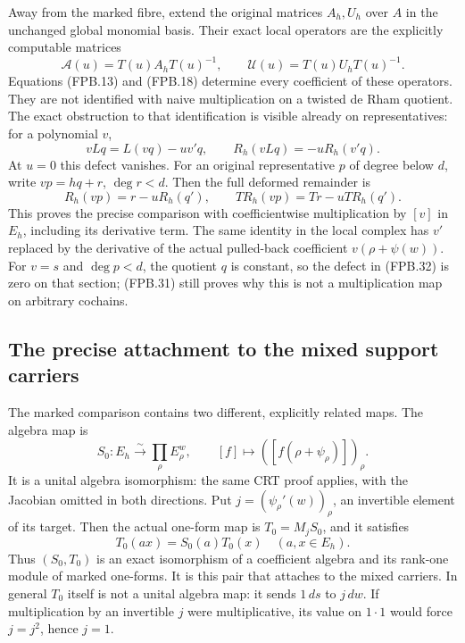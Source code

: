Away from the marked fibre, extend the original matrices \(A_h,U_h\)
over \(A\) in the unchanged global monomial basis. Their exact local
operators are the explicitly computable matrices
\[
 \mathcal A(u)=T(u)A_hT(u)^{-1},\qquad
 \mathcal U(u)=T(u)U_hT(u)^{-1}.
 \tag{FPB.30}\label{eq:fpb-transported-operators}
\]
Equations (FPB.13) and (FPB.18) determine every coefficient of these
operators. They are not identified with naive multiplication on a
twisted de Rham quotient. The exact obstruction to that identification
is visible already on representatives: for a polynomial \(v\),
\[
 vLq=L(vq)-u v'q,\qquad
 R_h(vLq)=-uR_h(v'q).
 \tag{FPB.31}\label{eq:fpb-Leibniz}
\]
At \(u=0\) this defect vanishes. For an original representative
\(p\) of degree below \(d\), write \(vp=hq+r\), \(\deg r<d\).
Then the full deformed remainder is
\[
 R_h(vp)=r-uR_h(q'),
 \qquad
 T R_h(vp)=T r-uT R_h(q').
 \tag{FPB.32}\label{eq:fpb-mult-remainder}
\]
This proves the precise comparison with coefficientwise multiplication
by \([v]\) in \(E_h\), including its derivative term. The same
identity in the local complex has \(v'\) replaced by the derivative
of the actual pulled-back coefficient \(v(\rho+\psi(w))\).
For \(v=s\) and \(\deg p<d\), the quotient \(q\) is constant,
so the defect in (FPB.32) is zero on that section; (FPB.31) still
proves why this is not a multiplication map on arbitrary cochains.

\subsection{The precise attachment to the mixed support carriers}

The marked comparison contains two different, explicitly related
maps. The algebra map is
\[
 S_0:E_h\xrightarrow{\sim}\prod_\rho E_\rho^w,
 \qquad [f]\longmapsto([f(\rho+\psi_\rho)])_\rho.
 \tag{FPB.33}\label{eq:fpb-ring-map}
\]
It is a unital algebra isomorphism: the same CRT proof applies, with
the Jacobian omitted in both directions. Put
\(j=(\psi_\rho'(w))_\rho\), an invertible element of its target.
Then the actual one-form map is \(T_0=M_jS_0\), and it satisfies
\[
 T_0(a x)=S_0(a)T_0(x)\quad(a,x\in E_h).
 \tag{FPB.34}\label{eq:fpb-semilinear}
\]
Thus \((S_0,T_0)\) is an exact isomorphism of a coefficient algebra
and its rank-one module of marked one-forms. It is this pair that
attaches to the mixed carriers. In general \(T_0\) itself is not
a unital algebra map: it sends \(1\,ds\) to \(j\,dw\). If
multiplication by an invertible \(j\) were multiplicative, its value
on \(1\cdot1\) would force \(j=j^2\), hence \(j=1\).

